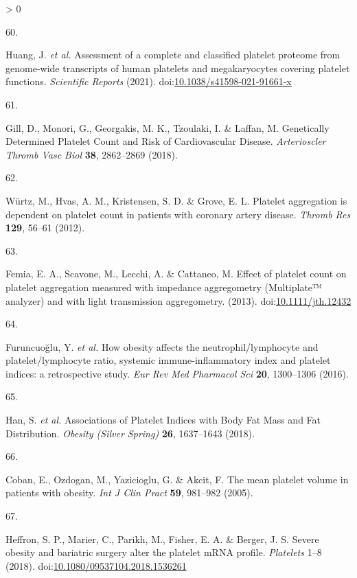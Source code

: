 \documentclass[11pt,twoside]{bristolthesis}
\newlength{\cslhangindent}
\newlength{\csllabelwidth}
\newenvironment{CSLReferences}[2] %
 {%
  \setlength{\parindent}{0pt}
  \ifodd #1 \everypar{\setlength{\hangindent}{\cslhangindent}}\ignorespaces\fi
  \ifnum #2 > 0
  \setlength{\parskip}{#2\baselineskip}
  \fi
 }%
 {}
\newcommand{\CSLLeftMargin}[1]{\parbox[t]{\csllabelwidth}{#1}}
\newcommand{\CSLRightInline}[1]{\parbox[t]{\linewidth - \csllabelwidth}{#1}\break}
\begin{document}
\begin{CSLReferences}{0}{0}
\leavevmode\hypertarget{ref-Huang2021}{}%
\CSLLeftMargin{60. }
\CSLRightInline{Huang, J. \emph{et al.} {Assessment of a complete and classified platelet proteome from genome-wide transcripts of human platelets and megakaryocytes covering platelet functions}. \emph{Scientific Reports} (2021). doi:\href{https://doi.org/10.1038/s41598-021-91661-x}{10.1038/s41598-021-91661-x}}

\leavevmode\hypertarget{ref-Gill2018}{}%
\CSLLeftMargin{61. }
\CSLRightInline{Gill, D., Monori, G., Georgakis, M. K., Tzoulaki, I. \& Laffan, M. {Genetically Determined Platelet Count and Risk of Cardiovascular Disease}. \emph{Arterioscler Thromb Vasc Biol} \textbf{38}, 2862--2869 (2018).}

\leavevmode\hypertarget{ref-Wurtz2012}{}%
\CSLLeftMargin{62. }
\CSLRightInline{Würtz, M., Hvas, A. M., Kristensen, S. D. \& Grove, E. L. {Platelet aggregation is dependent on platelet count in patients with coronary artery disease}. \emph{Thromb Res} \textbf{129}, 56--61 (2012).}

\leavevmode\hypertarget{ref-Femia2013}{}%
\CSLLeftMargin{63. }
\CSLRightInline{Femia, E. A., Scavone, M., Lecchi, A. \& Cattaneo, M. {Effect of platelet count on platelet aggregation measured with impedance aggregometry (Multiplate™ analyzer) and with light transmission aggregometry}. (2013). doi:\href{https://doi.org/10.1111/jth.12432}{10.1111/jth.12432}}

\leavevmode\hypertarget{ref-Furuncuoglu2016}{}%
\CSLLeftMargin{64. }
\CSLRightInline{Furuncuoğlu, Y. \emph{et al.} {How obesity affects the neutrophil/lymphocyte and platelet/lymphocyte ratio, systemic immune-inflammatory index and platelet indices: a retrospective study}. \emph{Eur Rev Med Pharmacol Sci} \textbf{20}, 1300--1306 (2016).}

\leavevmode\hypertarget{ref-Han2018a}{}%
\CSLLeftMargin{65. }
\CSLRightInline{Han, S. \emph{et al.} {Associations of Platelet Indices with Body Fat Mass and Fat Distribution}. \emph{Obesity (Silver Spring)} \textbf{26}, 1637--1643 (2018).}

\leavevmode\hypertarget{ref-Coban2005}{}%
\CSLLeftMargin{66. }
\CSLRightInline{Coban, E., Ozdogan, M., Yazicioglu, G. \& Akcit, F. {The mean platelet volume in patients with obesity}. \emph{Int J Clin Pract} \textbf{59}, 981--982 (2005).}

\leavevmode\hypertarget{ref-Heffron2018}{}%
\CSLLeftMargin{67. }
\CSLRightInline{Heffron, S. P., Marier, C., Parikh, M., Fisher, E. A. \& Berger, J. S. {Severe obesity and bariatric surgery alter the platelet mRNA profile}. \emph{Platelets} 1--8 (2018). doi:\href{https://doi.org/10.1080/09537104.2018.1536261}{10.1080/09537104.2018.1536261}}


\end{CSLReferences}
\end{document}
